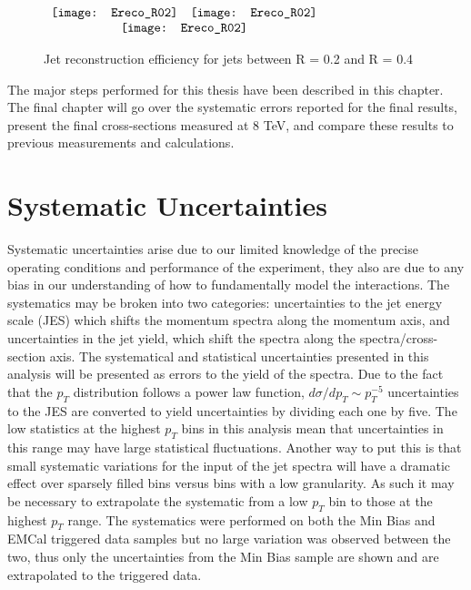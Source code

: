 \begin{figure*}[t!]
$\begin{array}{rl}
    \texttt{[image: Ereco\_R02]} &
    \texttt{[image: Ereco\_R02]}\\
    \multicolumn{2}{c}{\texttt{[image: Ereco\_R02]}}
\end{array}$
\caption[Jet reconstruction efficiency for jets between R = 0.2 and R = 0.4.]{\label{fig:JetRecoeff}Jet reconstruction efficiency for jets between R = 0.2 and R = 0.4}
\end{figure*}


The major steps performed for this thesis have been described in this chapter.  The final chapter will go over the systematic errors reported for the final results, present the final cross-sections measured at 8 TeV, and compare these results to previous measurements and  calculations.

\section{Systematic Uncertainties}

Systematic uncertainties arise due to our limited knowledge of the precise operating conditions and performance of the experiment, they also are due to any bias in our understanding of how to fundamentally model the interactions.  The systematics may be broken into two categories: uncertainties to the jet energy scale (JES) which shifts the momentum spectra along the momentum axis, and uncertainties in the jet yield, which shift the spectra along the spectra/cross-section axis.  The systematical and statistical uncertainties presented in this analysis will be presented as errors to the yield of the spectra.  Due to the fact that the $p_{T}$ distribution follows a power law function, $d\sigma/dp_{T} \sim p_{T}^{-5}$ uncertainties to the JES are converted to yield uncertainties by dividing each one by five.
The low statistics at the highest $p_{T}$ bins in this analysis mean that uncertainties in this range may have large statistical fluctuations.  Another way to put this is that small systematic variations for the input of the jet spectra will have a dramatic effect over sparsely filled bins versus bins with a low granularity.  As such it may be necessary to extrapolate the systematic from a low $p_{T}$ bin to those at the highest $p_{T}$ range.  The systematics were performed on both the Min Bias and EMCal triggered data samples but no large variation was observed between the two, thus only the uncertainties from the Min Bias sample are shown and are extrapolated to the triggered data.


